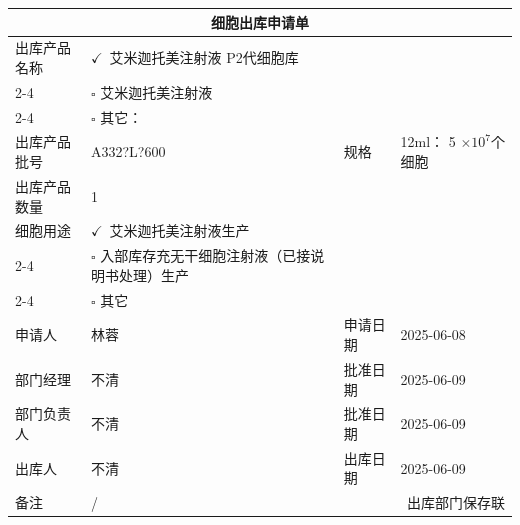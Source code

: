 \documentclass[UTF8,10pt,a4paper,fontset=fandol]{ctexart}
\renewcommand{\arraystretch}{1.15}
\newcommand{\fieldvalue}[1]{#1}
\newcommand{\handwritten}[1]{#1}
\let\mathcheckmark\checkmark
\renewcommand{\checkmark}{\ensuremath{\mathcheckmark}}
\begin{document}
\renewcommand{\arraystretch}{1.45}
\small
\begin{tabularx}{\textwidth}{|p{3.0cm}|X|p{2.5cm}|X|}
\hline
\multicolumn{4}{|c|}{\textbf{细胞出库申请单}}\\
\hline
出库产品名称
&
\fieldvalue{\ensuremath{\checkmark}\ 艾米迦托美注射液 P2代细胞库}
&
&
\\[-0.2em]
\cline{2-4}
&
$\square$ 艾米迦托美注射液
&
&
\\[-0.2em]
\cline{2-4}
&
$\square$ 其它：\hrulefill
&
&
\\
\hline
出库产品批号
&
\fieldvalue{\handwritten{A332?L?600}}
&
规格
&
12ml：
\fieldvalue{\handwritten{5}}
$\times 10^{7}$个细胞
\\
\hline
出库产品数量
&
\fieldvalue{\handwritten{1}}
&
&
\\
\hline
细胞用途
&
\fieldvalue{\ensuremath{\checkmark}\ 艾米迦托美注射液生产}
&
&
\\[-0.2em]
\cline{2-4}
&
$\square$ 入部库存充无干细胞注射液（已接说明书处理）生产
&
&
\\[-0.2em]
\cline{2-4}
&
$\square$ 其它
&
&
\\
\hline
申请人
&
\fieldvalue{\handwritten{林蓉}}
&
申请日期
&
\fieldvalue{\handwritten{2025-06-08}}
\\
\hline
部门经理
&
\fieldvalue{\handwritten{不清}}
&
批准日期
&
\fieldvalue{\handwritten{2025-06-09}}
\\
\hline
部门负责人
&
\fieldvalue{\handwritten{不清}}
&
批准日期
&
\fieldvalue{\handwritten{2025-06-09}}
\\
\hline
出库人
&
\fieldvalue{\handwritten{不清}}
&
出库日期
&
\fieldvalue{\handwritten{2025-06-09}}
\\
\hline
备注
&
\fieldvalue{\handwritten{/}}
&
\multicolumn{2}{r|}{出库部门保存联}
\\
\hline
\end{tabularx}
\end{document}
